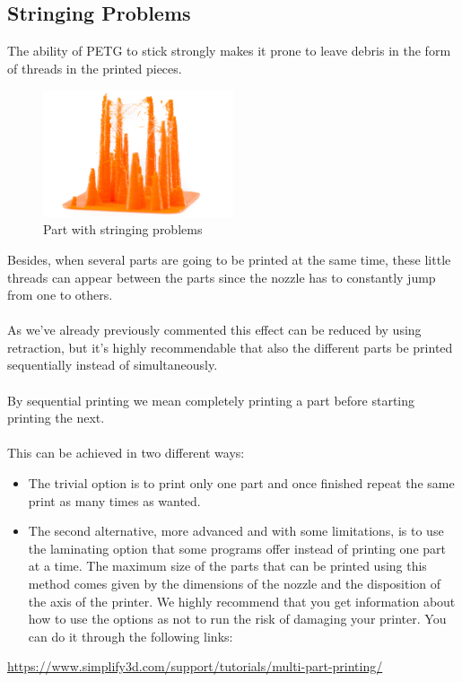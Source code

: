 \documentclass[11pt,a4paper]{article}
\begin{document}
	\subsection{Stringing Problems}The ability of PETG to stick strongly makes it prone to leave debris in the form of threads in the printed pieces.
\begin{figure}[H]
\centering
\includegraphics[width=0.5\textwidth,cfbox=azul_marcos 1pt 0pt]{FOTOS/RETRACCION1}
\caption*{Part with stringing problems}
\end{figure}
Besides, when several parts are going to be printed at the same time, these little threads can appear between the parts since the nozzle has to constantly jump from one to others.
\\\\
As we’ve already previously commented this effect can be reduced by using retraction, but it’s highly recommendable that also the different parts be printed sequentially instead of simultaneously.
\\\\
By sequential printing we mean completely printing a part before starting printing the next.
\\\\
This can be achieved in two different ways:
\begin{itemize}
\item The trivial option is to print only one part and once finished repeat the same print as many times as wanted.
\item The second alternative, more advanced and with some limitations, is to use the laminating option that some programs offer instead of printing one part at a time. The maximum size of the parts that can be printed using this method comes given by the dimensions of the nozzle and the disposition of the axis of the printer. We highly recommend that you get information about how to use the options as not to run the risk of damaging your printer. You can do it through the following links:
\end{itemize}
\url{https://www.simplify3d.com/support/tutorials/multi-part-printing/}\\
\end{document}
